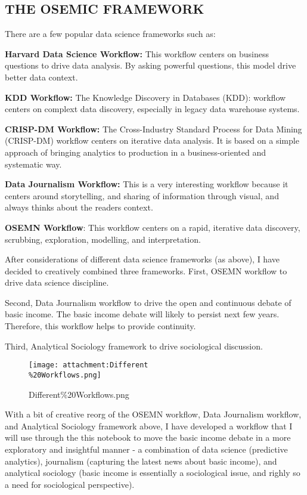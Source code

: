 \documentclass[11pt]{article}
\makeatletter
\def\maxwidth{\ifdim\Gin@nat@width>\linewidth\linewidth
    \else\Gin@nat@width\fi}
\let\Oldincludegraphics\includegraphics
\renewcommand{\includegraphics}[1]{\Oldincludegraphics[width=.8\maxwidth]{#1}}
\makeatother
\begin{document}
    \hypertarget{the-osemic-framework}{%
\subsection{THE OSEMIC FRAMEWORK}\label{the-osemic-framework}}

There are a few popular data science frameworks such as:

\textbf{Harvard Data Science Workflow:} This workflow centers on
business questions to drive data analysis. By asking powerful questions,
this model drive better data context.

\textbf{KDD Workflow:} The Knowledge Discovery in Databases (KDD):
workflow centers on complext data discovery, especially in legacy data
warehouse systems.

\textbf{CRISP-DM Workflow:} The Cross-Industry Standard Process for Data
Mining (CRISP-DM) workflow centers on iterative data analysis. It is
based on a simple approach of bringing analytics to production in a
business-oriented and systematic way.

\textbf{Data Journalism Workflow:} This is a very interesting workflow
because it centers around storytelling, and sharing of information
through visual, and always thinks about the readers context.

\textbf{OSEMN Workflow}: This workflow centers on a rapid, iterative
data discovery, scrubbing, exploration, modelling, and interpretation.

After considerations of different data science frameworks (as above), I
have decided to creatively combined three frameworks. First, OSEMN
workflow to drive data science discipline.

Second, Data Journalism workflow to drive the open and continuous debate
of basic income. The basic income debate will likely to persist next few
years. Therefore, this workflow helps to provide continuity.

Third, Analytical Sociology framework to drive sociological discussion.

    \begin{figure}
\centering
\texttt{[image: attachment:Different\\\%20Workflows.png]}
\caption{Different\%20Workflows.png}
\end{figure}

    With a bit of creative reorg of the OSEMN workflow, Data Journalism
workflow, and Analytical Sociology framework above, I have developed a
workflow that I will use through the this notebook to move the basic
income debate in a more exploratory and insightful manner - a
combination of data science (predictive analytics), journalism
(capturing the latest news about basic income), and analytical sociology
(basic income is essentially a sociological issue, and righly so a need
for sociological perspective).
\end{document}
